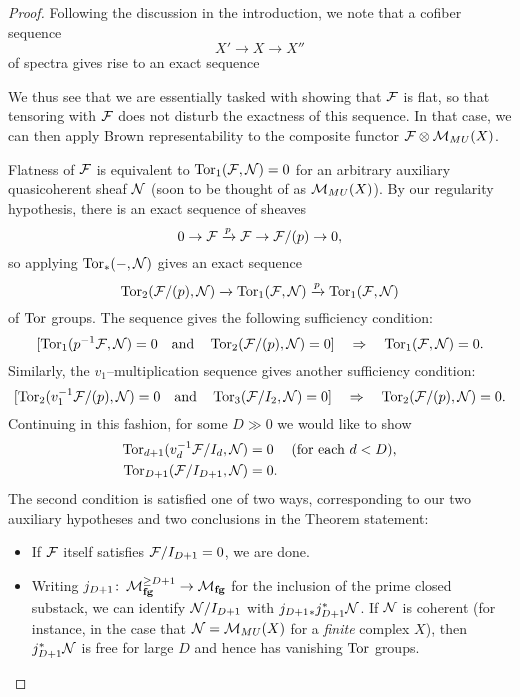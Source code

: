 \begin{proof}
Following the discussion in the introduction, we note that a cofiber sequence \[X' \to X \to X''\] of spectra gives rise to an exact sequence
\begin{center}
\end{center}
We thus see that we are essentially tasked with showing that $\mathcal{F}$ is flat, so that tensoring with $\mathcal{F}$ does not disturb the exactness of this sequence.  In that case, we can then apply Brown representability to the composite functor $\mathcal{F} \otimes \mathcal{M}_{MU}(X)$.

Flatness of $\mathcal{F}$ is equivalent to $\operatorname{Tor}_1(\mathcal{F}, \mathcal{N}) = 0$ for an arbitrary auxiliary quasicoherent sheaf $\mathcal{N}$ (soon to be thought of as $\mathcal{M}_{MU}(X)$).  By our regularity hypothesis, there is an exact sequence of sheaves \[0 \to \mathcal{F} \xrightarrow{p} \mathcal{F} \to \mathcal{F} / (p) \to 0,\] so applying $\operatorname{Tor}_*(-, \mathcal{N})$ gives an exact sequence \[\operatorname{Tor}_2(\mathcal{F} / (p), \mathcal{N}) \xrightarrow{} \operatorname{Tor}_1(\mathcal{F}, \mathcal{N}) \xrightarrow{p} \operatorname{Tor}_1(\mathcal{F}, \mathcal{N})\] of $\operatorname{Tor}$ groups.  The sequence gives the following sufficiency condition: \[[\operatorname{Tor}_1(p^{-1} \mathcal{F}, \mathcal{N}) = 0 \quad \text{and} \quad \operatorname{Tor}_2(\mathcal{F}/(p), \mathcal{N}) = 0] \quad \Rightarrow \quad \operatorname{Tor}_1(\mathcal{F}, \mathcal{N}) = 0.\]  Similarly, the $v_1$--multiplication sequence gives another sufficiency condition: \[[\operatorname{Tor}_2(v_1^{-1} \mathcal{F}/(p), \mathcal{N}) = 0 \quad \text{and} \quad \operatorname{Tor}_3(\mathcal{F}/I_2, \mathcal{N}) = 0] \quad \Rightarrow \quad \operatorname{Tor}_2(\mathcal{F}/(p), \mathcal{N}) = 0.\]  Continuing in this fashion, for some $D \gg 0$ we would like to show
\begin{align*}
\operatorname{Tor}_{d+1}(v_d^{-1} \mathcal{F}/I_d, \mathcal{N}) & = 0 & \text{(for each $d < D$),} \\
\operatorname{Tor}_{D+1}(\mathcal{F}/I_{D+1}, \mathcal{N}) & = 0.
\end{align*}
The second condition is satisfied one of two ways, corresponding to our two auxiliary hypotheses and two conclusions in the Theorem statement:
\begin{itemize}
\item If $\mathcal{F}$ itself satisfies $\mathcal{F} / I_{D+1} = 0$, we are done.
\item Writing $j_{D+1}\colon\thinspace \mathcal{M}_{\mathbf{fg}}^{\ge D+1} \to \mathcal{M}_{\mathbf{fg}}$ for the inclusion of the prime closed substack, we can identify $\mathcal{N} / I_{D+1}$ with $j_{D+1}{}_* j_{D+1}^* \mathcal{N}$.  If $\mathcal{N}$ is coherent (for instance, in the case that $\mathcal{N} = \mathcal{M}_{MU}(X)$ for a \emph{finite} complex $X$), then $j_{D+1}^* \mathcal{N}$ is free for large $D$ and hence has vanishing $\operatorname{Tor}$ groups.
\end{itemize}


\end{proof}
